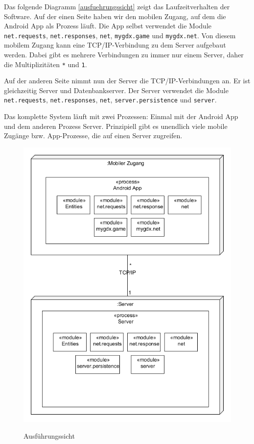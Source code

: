 Das folgende Diagramm \vref{ausfuehrungssicht} zeigt das Laufzeitverhalten der Software.
Auf der einen Seite haben wir den mobilen Zugang, auf dem die Android App als Prozess läuft. Die App selbst verwendet die Module \texttt{net.requests}, \texttt{net.responses}, \texttt{net}, \texttt{mygdx.game} und \texttt{mygdx.net}. Von diesem mobilem Zugang kann eine TCP/IP-Verbindung zu dem Server aufgebaut werden. Dabei gibt es mehrere Verbindungen zu immer nur einem Server, daher die Multiplizitäten \texttt{*} und \texttt{1}.

Auf der anderen Seite nimmt nun der Server die TCP/IP-Verbindungen an. Er ist gleichzeitig Server und Datenbankserver. Der Server verwendet die Module \texttt{net.requests}, \texttt{net.responses}, \texttt{net}, \texttt{server.persistence} und \texttt{server}.

Das komplette System läuft mit zwei Prozessen: Einmal mit der Android App und dem anderen Prozess Server. Prinzipiell gibt es unendlich viele mobile Zugänge bzw. App-Prozesse, die auf einen Server zugreifen.
\newpage
\begin{figure} [H] 
\caption{Ausführungssicht} 
	\includegraphics[width=1\textwidth]{Diagramme/ausfuehrungssicht.png} 
	\label{ausfuehrungssicht} 
\end{figure}
